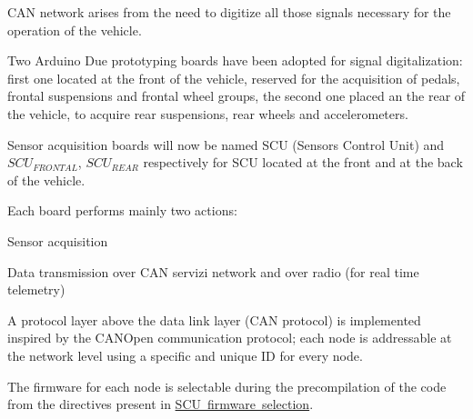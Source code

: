 C\+AN network arises from the need to digitize all those signals necessary for the operation of the vehicle.

Two Arduino Due prototyping boards have been adopted for signal digitalization\+: first one located at the front of the vehicle, reserved for the acquisition of pedals, frontal suspensions and frontal wheel groups, the second one placed an the rear of the vehicle, to acquire rear suspensions, rear wheels and accelerometers.

Sensor acquisition boards will now be named S\+CU (Sensors Control Unit) and $SCU_{FRONTAL}$, $SCU_{REAR}$ respectively for S\+CU located at the front and at the back of the vehicle.

Each board performs mainly two actions\+:
\begin{DoxyItemize}
\item Sensor acquisition
\item Data transmission over C\+AN servizi network and over radio (for real time telemetry)
\end{DoxyItemize}

A protocol layer above the data link layer (C\+AN protocol) is implemented inspired by the C\+A\+N\+Open communication protocol; each node is addressable at the network level using a specific and unique ID for every node.

The firmware for each node is selectable during the precompilation of the code from the directives present in \mbox{\hyperlink{group___s_c_u__firmware__selection}{S\+CU firmware selection}}. 